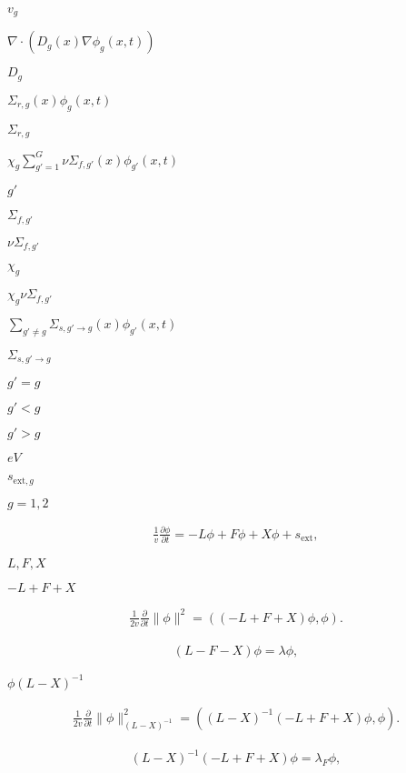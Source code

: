 \documentclass{article}
\begin{document}
$v_g$
\pagebreak

$\nabla \cdot(D_g(x) \nabla \phi_g(x,t))$
\pagebreak

$D_g$
\pagebreak

$\Sigma_{r,g}(x)\phi_g(x,t)$
\pagebreak

$\Sigma_{r,g}$
\pagebreak

$\chi_g\sum_{g'=1}^G\nu\Sigma_{f,g'}(x)\phi_{g'}(x,t)$
\pagebreak

$g'$
\pagebreak

$\Sigma_{f,g'}$
\pagebreak

$\nu\Sigma_{f,g'}$
\pagebreak

$\chi_g$
\pagebreak

$\chi_g\nu\Sigma_{f,g'}$
\pagebreak

$\sum_{g'\ne g}\Sigma_{s,g'\to g}(x)\phi_{g'}(x,t)$
\pagebreak

$\Sigma_{s,g'\to g}$
\pagebreak

$g'=g$
\pagebreak

$g'<g$
\pagebreak

$g'>g$
\pagebreak

$eV$
\pagebreak

$s_{\mathrm{ext},g}$
\pagebreak

$g=1,2$
\pagebreak

\begin{eqnarray*} \frac 1v \frac{\partial \phi}{\partial t} = -L\phi + F\phi + X\phi + s_{\mathrm{ext}}, \end{eqnarray*}
\pagebreak

$L,F,X$
\pagebreak

$-L+F+X$
\pagebreak

\begin{eqnarray*} \frac 1{2v} \frac{\partial}{\partial t} \|\phi\|^2 = ((-L+F+X)\phi,\phi). \end{eqnarray*}
\pagebreak

\begin{eqnarray*} (L-F-X) \phi = \lambda \phi, \end{eqnarray*}
\pagebreak

$\phi(L-X)^{-1}$
\pagebreak

\begin{eqnarray*} \frac 1{2v} \frac{\partial}{\partial t} \|\phi\|^2_{(L-X)^{-1}} = ((L-X)^{-1}(-L+F+X)\phi,\phi). \end{eqnarray*}
\pagebreak

\begin{eqnarray*} (L-X)^{-1}(-L+F+X)\phi = \lambda_F \phi, \end{eqnarray*}
\pagebreak
\end{document}
